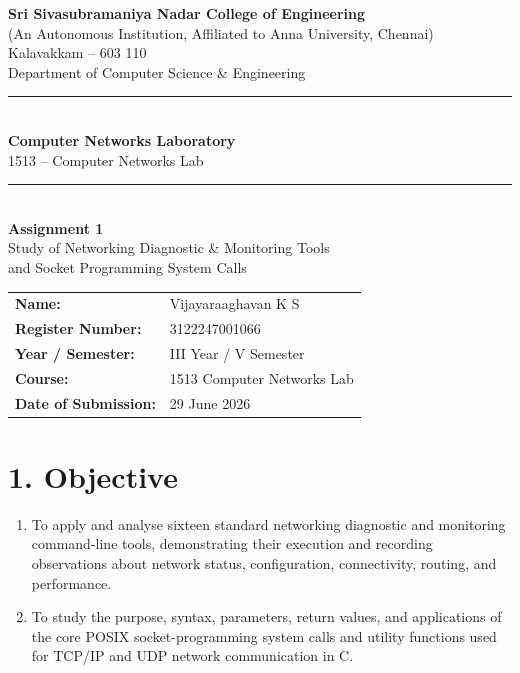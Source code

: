 \documentclass[11pt]{article}
\title{\vspace{-2cm}}
\date{}
\begin{document}
\begin{titlepage}
\centering
\vspace*{1cm}
{\large \textbf{Sri Sivasubramaniya Nadar College of Engineering}}\\
{\small (An Autonomous Institution, Affiliated to Anna University, Chennai)}\\
{\small Kalavakkam -- 603 110}\\[0.3cm]
{\small Department of Computer Science \& Engineering}\\[1.5cm]

\rule{\linewidth}{0.5mm}\\[0.4cm]
{\LARGE \textbf{Computer Networks Laboratory}}\\[0.3cm]
{\Large 1513 -- Computer Networks Lab}\\[0.4cm]
\rule{\linewidth}{0.5mm}\\[1.5cm]

{\huge \textbf{Assignment 1}}\\[0.4cm]
{\Large Study of Networking Diagnostic \& Monitoring Tools\\ and Socket Programming System Calls}\\[2cm]

\begin{center}
\begin{tabular}{ll}
\textbf{Name:} & Vijayaraaghavan K S \\[0.2cm]
\textbf{Register Number:} & 3122247001066 \\[0.2cm]
\textbf{Year / Semester:} & III Year / V Semester \\[0.2cm]
\textbf{Course:} & 1513 Computer Networks Lab \\[0.2cm]
\textbf{Date of Submission:} & 29 June 2026 \\[0.2cm]
\end{tabular}
\end{center}

\vfill
\end{titlepage}

\section*{1. Objective}
\begin{enumerate}
  \item To apply and analyse sixteen standard networking diagnostic and monitoring
        command-line tools, demonstrating their execution and recording observations about
        network status, configuration, connectivity, routing, and performance.
  \item To study the purpose, syntax, parameters, return values, and applications of the
        core POSIX socket-programming system calls and utility functions used for TCP/IP and
        UDP network communication in C.
\end{enumerate}
\end{document}
